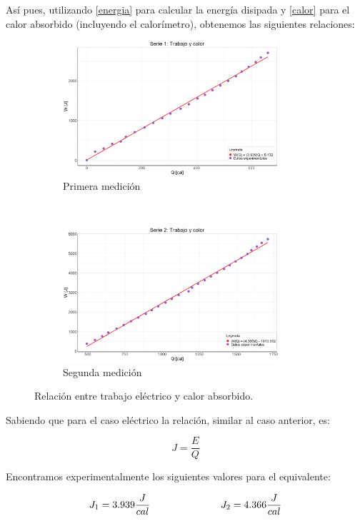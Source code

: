 \documentclass{article}
\begin{document}
Así pues, utilizando \ref{energia} para calcular la energía disipada y \ref{calor} para el calor absorbido (incluyendo el calorímetro), obtenemos las siguientes relaciones:

\begin{figure}[H]
    \centering
    \begin{subfigure}[t]{0.5\textwidth}
        \centering
        \includegraphics[height=5cm]{model_1.png}
        \caption{Primera medición}
    \end{subfigure}%
    ~ 
    \begin{subfigure}[t]{0.5\textwidth}
        \centering
        \includegraphics[height=5cm]{model_2.png}
        \caption{Segunda medición}
    \end{subfigure}
    \caption{Relación entre trabajo eléctrico y calor absorbido.}
    \label{fig:calortrabajo}
\end{figure}

Sabiendo que para el caso eléctrico la relación, similar al caso anterior, es:

\begin{equation}
    J = \frac{E}{Q}
    \label{eqivelec}
\end{equation}

Encontramos experimentalmente los siguientes valores para el equivalente:

\begin{equation*}
    J_1 = 3.939 \frac{J}{cal} \hspace{2.5cm} J_2 = 4.366 \frac{J}{cal}
\end{equation*}
\end{document}
